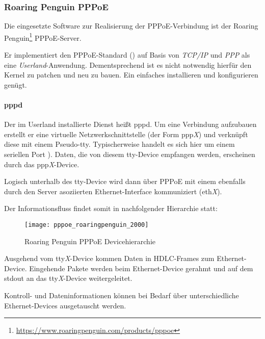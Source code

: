 \subsubsection{Roaring Penguin PPPoE}
Die eingesetzte Software zur Realisierung der PPPoE-Verbindung ist der
Roaring Penguin\footnote{\url{https://www.roaringpenguin.com/products/pppoe}} PPPoE-Server.

Er implementiert den PPPoE-Standard () auf Basis
von \textit{TCP/IP} und \textit{PPP} als eine \textit{Userland}-Anwendung.
Dementsprechend ist es nicht notwendig hierfür den Kernel zu patchen und neu zu bauen.
Ein einfaches installieren und konfigurieren genügt.

\paragraph{pppd}
Der im Userland installierte Dienst heißt pppd. Um eine Verbindung aufzubauen
erstellt er eine virtuelle Netzwerkschnittstelle (der Form ppp\textit{X}) und verknüpft diese
mit einem Pseudo-\ac{tty}. %
Typischerweise handelt es sich hier um einem seriellen Port \cite{roaringpenguinpres}).
Daten, die von diesem tty-Device empfangen werden, erscheinen durch das ppp\textit{X}-Device.

Logisch unterhalb des tty-Device wird dann über PPPoE mit einem ebenfalls durch den Server
asoziierten Ethernet-Interface kommuniziert (eth\textit{X}).

Der Informationsfluss findet somit in nachfolgender Hierarchie statt:
 \begin{figure}[htp]
  \begin{center}
   \texttt{[image: pppoe\_roaringpenguin\_2000]}
  \end{center}
  \caption[Roaring Penguin PPPoE Devicehierarchie]{Roaring Penguin PPPoE Devicehierarchie \cite{roaringpenguinpres}}
  \label{fig:pppoe_roaringpenguin_devicehierarchy}
 \end{figure}

Ausgehend vom tty\textit{X}-Device kommen Daten in \ac{HDLC}-Frames zum Ethernet-Device.
Eingehende Pakete werden beim Ethernet-Device gerahmt und auf dem stdout an
das tty\textit{X}-Device weitergeleitet.

Kontroll- und Dateninformationen können bei Bedarf über unterschiedliche
Ethernet-Devices ausgetauscht werden.

